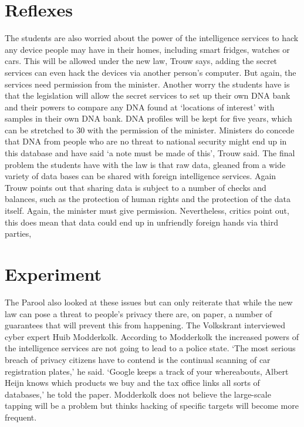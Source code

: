 \documentclass[]{book}
\begin{document}
\chapter{Reflexes}\label{reflexes}

The students are also worried about the power of the intelligence
services to hack any device people may have in their homes, including
smart fridges, watches or cars. This will be allowed under the new law,
Trouw says, adding the secret services can even hack the devices via
another person's computer. But again, the services need permission from
the minister. Another worry the students have is that the legislation
will allow the secret services to set up their own DNA bank and their
powers to compare any DNA found at `locations of interest' with samples
in their own DNA bank. DNA profiles will be kept for five years, which
can be stretched to 30 with the permission of the minister. Ministers do
concede that DNA from people who are no threat to national security
might end up in this database and have said `a note must be made of
this', Trouw said. The final problem the students have with the law is
that raw data, gleaned from a wide variety of data bases can be shared
with foreign intelligence services. Again Trouw points out that sharing
data is subject to a number of checks and balances, such as the
protection of human rights and the protection of the data itself. Again,
the minister must give permission. Nevertheless, critics point out, this
does mean that data could end up in unfriendly foreign hands via third
parties,

\chapter{Experiment}\label{experiment}

The Parool also looked at these issues but can only reiterate that while
the new law can pose a threat to people's privacy there are, on paper, a
number of guarantees that will prevent this from happening. The
Volkskrant interviewed cyber expert Huib Modderkolk. According to
Modderkolk the increased powers of the intelligence services are not
going to lead to a police state. `The most serious breach of privacy
citizens have to contend is the continual scanning of car registration
plates,' he said. `Google keeps a track of your whereabouts, Albert
Heijn knows which products we buy and the tax office links all sorts of
databases,' he told the paper. Modderkolk does not believe the
large-scale tapping will be a problem but thinks hacking of specific
targets will become more frequent.
\end{document}
